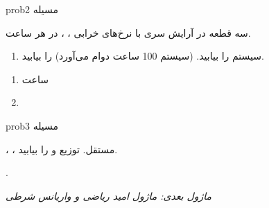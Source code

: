 \begin{PSbox}[unbreakable]{prob}{مسیله 2}

سه قطعه در آرایش سری با نرخ‌های خرابی ، ،  در هر ساعت.

\begin{enumerate}
\def\labelenumi{(\alph{enumi})}
\tightlist
\item
   سیستم را بیابید. (سیستم 100 ساعت دوام می‌آورد) را بیابید.
\end{enumerate}

\PSsolution{} 

\begin{enumerate}
\def\labelenumi{(\alph{enumi})}
\tightlist
\item
   ساعت
\item
\end{enumerate}

\end{PSbox}

\begin{PSbox}[unbreakable]{prob}{مسیله 3}

، ، مستقل. توزیع و  را بیابید.

\PSsolution{} .

\emph{ماژول بعدی: {ماژول  امید ریاضی و واریانس شرطی}}\PSbr{}

\end{PSbox}
